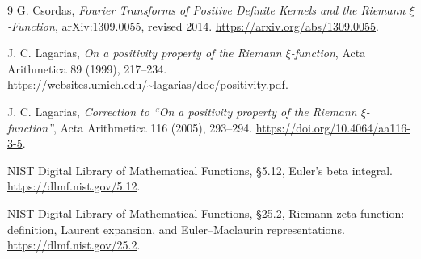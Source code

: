 \documentclass[11pt,letterpaper]{article}
\numberwithin{equation}{section}
\theoremstyle{remark}\newtheorem{remark}[theorem]{Remark}
\begin{document}
\clearpage
\begin{thebibliography}{9}
G. Csordas, \emph{Fourier Transforms of Positive Definite Kernels and the Riemann $\xi$-Function}, arXiv:1309.0055, revised 2014.
\url{https://arxiv.org/abs/1309.0055}.

J. C. Lagarias, \emph{On a positivity property of the Riemann $\xi$-function}, Acta Arithmetica 89 (1999), 217--234.
\url{https://websites.umich.edu/~lagarias/doc/positivity.pdf}.

J. C. Lagarias, \emph{Correction to ``On a positivity property of the Riemann $\xi$-function''}, Acta Arithmetica 116 (2005), 293--294.
\url{https://doi.org/10.4064/aa116-3-5}.

NIST Digital Library of Mathematical Functions, \S5.12, Euler's beta integral.
\url{https://dlmf.nist.gov/5.12}.

NIST Digital Library of Mathematical Functions, \S25.2, Riemann zeta function: definition, Laurent expansion, and Euler--Maclaurin representations.
\url{https://dlmf.nist.gov/25.2}.
\end{thebibliography}
\end{document}
